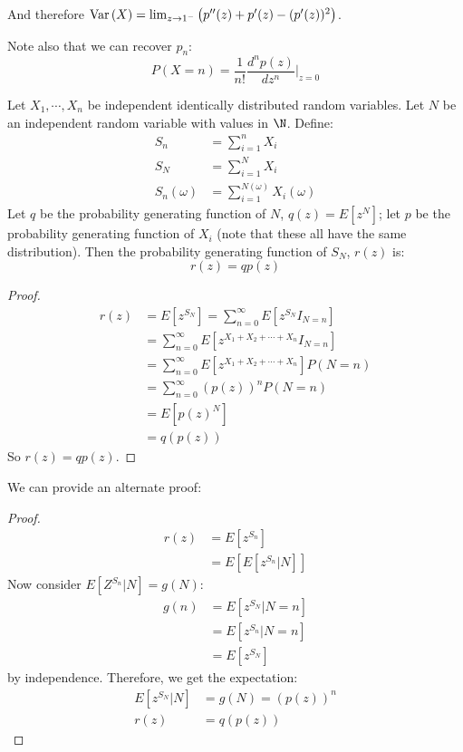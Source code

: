 \documentclass[../Main.tex]{subfiles}
\begin{document}
And therefore $\operatorname{Var}{(X)} = \lim_{z \to 1^-} \left(p''(z) + p'(z) - (p'(z))^2\right)$.\par
Note also that we can recover $p_n$:
\begin{equation}
    P(X = n) = \frac{1}{n!} \frac{d^n p(z)}{dz^n} |_{z = 0}
    \label{eqnPGFProb}
\end{equation}
\begin{proposition}
    Let $X_1, \cdots, X_n$ be independent identically distributed random variables. Let $N$ be an independent random variable with values in $\N$. Define:
    \begin{align*}
        S_n &= \sum_{i=1}^n X_i \\
        S_N &= \sum_{i=1}^N X_i \\
        S_n(\omega) &= \sum_{i=1}^{N(\omega)} X_i(\omega)
    \end{align*}
    Let $q$ be the probability generating function of $N$, $q(z) = E[z^N]$; let $p$ be the probability generating function of $X_i$ (note that these all have the same distribution).
    Then the probability generating function of $S_N$, $r(z)$ is:
    \begin{equation*}
        r(z) = qp(z)
    \end{equation*}
\end{proposition}
\begin{proof}
    \begin{align*}
        r(z) &= E[z^{S_N}] = \sum_{n=0}^\infty E[z^{S_N} I_{N=n}] \\
        &= \sum_{n=0}^\infty E[z^{X_1 + X_2 + \cdots + X_n} I_{N=n}] \\
        &= \sum_{n=0}^\infty E[z^{X_1 + X_2 + \cdots + X_n}]P(N=n) \\
        &= \sum_{n=0}^\infty \left(p(z)\right)^n P(N=n) \\
        &= E[p(z)^N] \\
        &= q(p(z))
    \end{align*}
    So $r(z) = qp(z)$.
\end{proof}
We can provide an alternate proof:
\begin{proof}
    \begin{align*}
        r(z) &= E[z^{S_n}] \\
        &= E[E[z^{S_n} | N]]
    \end{align*}
    Now consider $E[Z^{S_n} | N] = g(N)$:
    \begin{align*}
        g(n) &= E[z^{S_N}|N=n] \\
        &= E[z^{S_n}|N=n] \\
        &= E[z^{S_N}]
    \end{align*}
    by independence. Therefore, we get the expectation:
    \begin{align*}
        E[z^{S_N} | N] &= g(N) = (p(z))^n \\
        r(z) &= q(p(z))
    \end{align*}
\end{proof}
\end{document}

